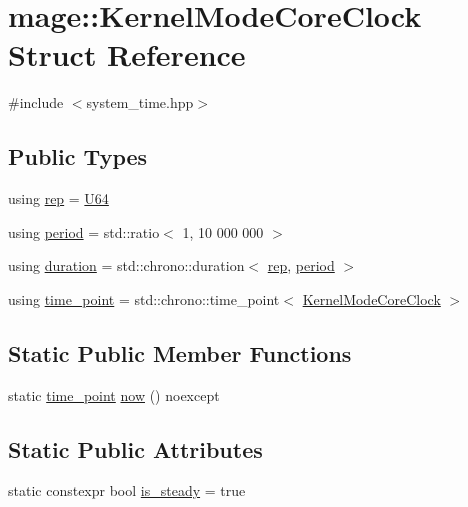 \hypertarget{structmage_1_1_kernel_mode_core_clock}{}\section{mage\+:\+:Kernel\+Mode\+Core\+Clock Struct Reference}
\label{structmage_1_1_kernel_mode_core_clock}


{\ttfamily \#include $<$system\+\_\+time.\+hpp$>$}

\subsection*{Public Types}
\begin{DoxyCompactItemize}
\item 
using \hyperlink{structmage_1_1_kernel_mode_core_clock_a5e5e420ec1a6aa530c109d0828a00116}{rep} = \hyperlink{namespacemage_a6672cf3c861707ce4a3235a3eb43941d}{U64}
\item 
using \hyperlink{structmage_1_1_kernel_mode_core_clock_ac1263f0146633a9b2f998839160dcc23}{period} = std\+::ratio$<$ 1, 10 \textquotesingle{}000 \textquotesingle{}000 $>$
\item 
using \hyperlink{structmage_1_1_kernel_mode_core_clock_aca31ec0a66308c4764cb0b16483095b1}{duration} = std\+::chrono\+::duration$<$ \hyperlink{structmage_1_1_kernel_mode_core_clock_a5e5e420ec1a6aa530c109d0828a00116}{rep}, \hyperlink{structmage_1_1_kernel_mode_core_clock_ac1263f0146633a9b2f998839160dcc23}{period} $>$
\item 
using \hyperlink{structmage_1_1_kernel_mode_core_clock_aca87172eb6e806a46d8792ca8239d2fe}{time\+\_\+point} = std\+::chrono\+::time\+\_\+point$<$ \hyperlink{structmage_1_1_kernel_mode_core_clock}{Kernel\+Mode\+Core\+Clock} $>$
\end{DoxyCompactItemize}
\subsection*{Static Public Member Functions}
\begin{DoxyCompactItemize}
\item 
static \hyperlink{structmage_1_1_kernel_mode_core_clock_aca87172eb6e806a46d8792ca8239d2fe}{time\+\_\+point} \hyperlink{structmage_1_1_kernel_mode_core_clock_adc5563b83439f3f732708e0ecd7c5490}{now} () noexcept
\end{DoxyCompactItemize}
\subsection*{Static Public Attributes}
\begin{DoxyCompactItemize}
\item 
static constexpr bool \hyperlink{structmage_1_1_kernel_mode_core_clock_a9b1fe608c5b68bfbe0dc07fefcd5a227}{is\+\_\+steady} = true
\end{DoxyCompactItemize}


